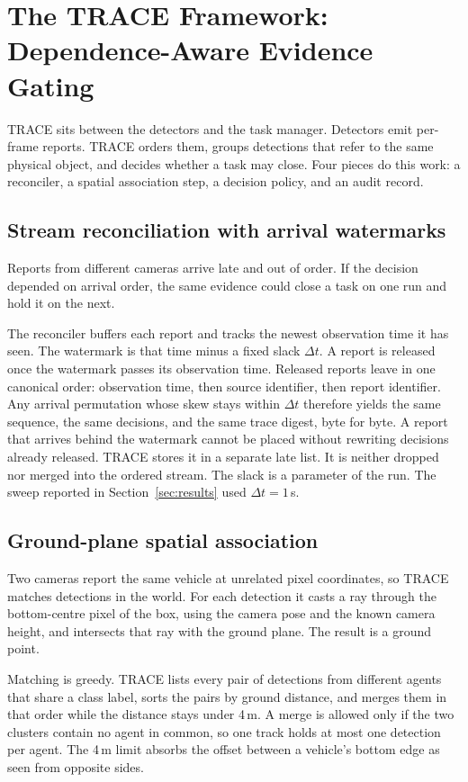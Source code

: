 \section{The TRACE Framework: Dependence-Aware Evidence Gating}
\label{sec:framework}

TRACE sits between the detectors and the task manager. Detectors emit
per-frame reports. TRACE orders them, groups detections that refer to the
same physical object, and decides whether a task may close. Four pieces do
this work: a reconciler, a spatial association step, a decision policy, and an
audit record.

\subsection{Stream reconciliation with arrival watermarks}
Reports from different cameras arrive late and out of order. If the decision
depended on arrival order, the same evidence could close a task on one run and
hold it on the next.

The reconciler buffers each report and tracks the newest observation time it
has seen. The watermark is that time minus a fixed slack $\Delta t$. A report
is released once the watermark passes its observation time. Released reports
leave in one canonical order: observation time, then source identifier, then
report identifier. Any arrival permutation whose skew stays within $\Delta t$
therefore yields the same sequence, the same decisions, and the same trace
digest, byte for byte. A report that arrives behind the watermark cannot be
placed without rewriting decisions already released. TRACE stores it in a
separate late list. It is neither dropped nor merged into the ordered stream.
The slack is a parameter of the run. The sweep reported in
Section~\ref{sec:results} used $\Delta t = 1$\,s.

\subsection{Ground-plane spatial association}
Two cameras report the same vehicle at unrelated pixel coordinates, so TRACE
matches detections in the world. For each detection it casts a ray through the
bottom-centre pixel of the box, using the camera pose and the known camera
height, and intersects that ray with the ground plane. The result is a ground
point.

Matching is greedy. TRACE lists every pair of detections from different
agents that share a class label, sorts the pairs by ground distance, and
merges them in that order while the distance stays under 4\,m. A merge is
allowed only if the two clusters contain no agent in common, so one track
holds at most one detection per agent. The 4\,m limit absorbs the offset
between a vehicle's bottom edge as seen from opposite sides.

